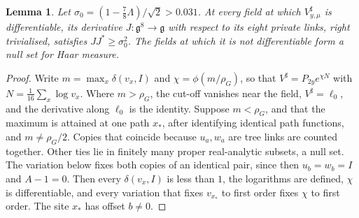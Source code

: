 \documentclass[11pt]{amsart}
\newtheorem{lemma}[theorem]{Lemma}
\theoremstyle{definition}
\theoremstyle{remark}
\numberwithin{equation}{section}
\newcommand{\g}{\mathfrak{g}}
\begin{document}
\begin{lemma}\label{lem:privatesubmersion}
Let $\sigma_0=(1-\frac78\Lambda)/\sqrt2>0.031$. At every field at which
$V^\sharp_{y,\mu}$ is differentiable, its derivative $J:\g^8\to\g$ with
respect to its eight private links, right trivialised, satisfies $JJ^*\ge
\sigma_0^2$. The fields at which it is not differentiable form a null set
for Haar measure.
\end{lemma}

\begin{proof}
Write $m=\max_x\delta(v_x,I)$ and $\chi=\phi(m/\rho_G)$, so that $V^\sharp=
P_{2y}e^{\chi N}$ with $N=\frac1{16}\sum_x\log v_x$. Where $m>\rho_G$, the
cut-off vanishes near the field, $V^\sharp=\ell_0$, and the derivative along
$\ell_0$ is the identity. Suppose $m<\rho_G$, and that the maximum is attained
at one path $x_*$, after identifying identical path functions, and
$m\ne\rho_G/2$. Copies that coincide because $u_a,w_a$ are tree links
are counted together. Other ties lie in finitely many proper
real-analytic subsets, a null set. The variation below fixes both copies
of an identical pair, since then $u_b=w_b=I$ and $A-1=0$. Then every
$\delta(v_x,I)$ is less than $1$, the logarithms are defined, $\chi$ is
differentiable, and every variation that fixes $v_{x_*}$ to first order
fixes $\chi$ to first order. The site $x_*$ has offset $b\ne0$.


\end{proof}
\end{document}
